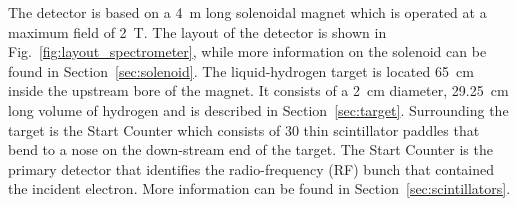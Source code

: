 The \gx{} detector is based on a 4~m long solenoidal magnet which is operated at a maximum field of 2~T. The layout of the detector is shown in Fig.~\ref{fig:layout_spectrometer}, while more information on the solenoid can be found in Section~\ref{sec:solenoid}. The liquid-hydrogen target is located 65~cm inside the upstream bore of the magnet. It consists of a 2~cm diameter, 29.25~cm long volume of hydrogen and is described in Section~\ref{sec:target}. Surrounding the target is the Start Counter which consists of 30 thin scintillator paddles that bend to a nose on the down-stream end of the target. The Start Counter is the primary detector that identifies the radio-frequency (RF) bunch that contained the incident electron. More information can be found in Section~\ref{sec:scintillators}. 


